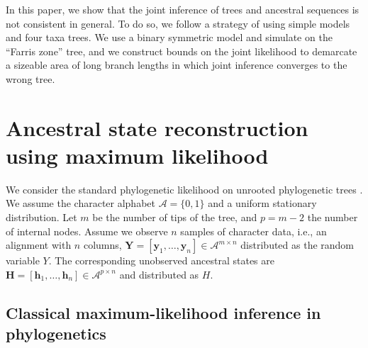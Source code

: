 \documentclass[a4paper]{article}
\newcommand{\alphabet}{\mathcal{A}}
\newcommand{\fullAlignment}{\mathbf{Y}}
\newcommand{\alignmentColumn}{\mathbf{y}}
\newcommand{\alignmentColumnRV}{Y}
\newcommand{\fullAncestralStates}{\mathbf{H}}
\newcommand{\ancestralStateColumn}{\mathbf{h}}
\newcommand{\ancestralStateColumnRV}{H}
\newcommand{\nCols}{n}
\newcommand{\nSiteRows}{m}
\newcommand{\nAncestralStateRows}{p}
\begin{document}
In this paper, we show that the joint inference of trees and ancestral sequences is not consistent in general.
To do so, we follow a strategy of using simple models and four taxa trees.
We use a binary symmetric model and simulate on the ``Farris zone'' \cite{Siddall1998-hq} tree, and we construct bounds on the joint likelihood to demarcate a sizeable area of long branch lengths in which joint inference converges to the wrong tree.

\section{Ancestral state reconstruction using maximum likelihood}

We consider the standard phylogenetic likelihood on unrooted phylogenetic trees \cite{Felsenstein2004}.
We assume the character alphabet $\alphabet=\{0,1\}$ and a uniform stationary distribution.
Let $\nSiteRows$ be the number of tips of the tree, and $\nAncestralStateRows = \nSiteRows-2$ the number of internal nodes.
Assume we observe $\nCols$ samples of character data, i.e., an alignment with $\nCols$ columns, $\fullAlignment=[\alignmentColumn_1,\ldots,\alignmentColumn_\nCols]\in\alphabet^{\nSiteRows\times\nCols}$ distributed as the random variable $\alignmentColumnRV$.
The corresponding unobserved ancestral states are $\fullAncestralStates=[\ancestralStateColumn_1,\ldots,\ancestralStateColumn_\nCols]\in\alphabet^{\nAncestralStateRows\times\nCols}$ and distributed as $\ancestralStateColumnRV$.

\subsection{Classical maximum-likelihood inference in phylogenetics}
\end{document}
